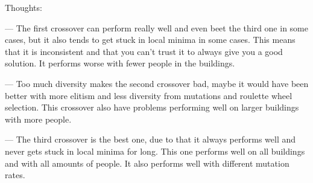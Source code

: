 Thoughts:

— The first crossover can perform really well and even beet the third one in some cases, but it also tends to get stuck in local minima in some cases. This means that it is inconsistent and that you can't trust it to always give you a good solution. It performs worse with fewer people in the buildings.

— Too much diversity makes the second crossover bad, maybe it would have been better with more elitism and less diversity from mutations and roulette wheel selection. This crossover also have problems performing well on larger buildings with more people.

— The third crossover is the best one, due to that it always performs well and never gets stuck in local minima for long. This one performs well on all buildings and with all amounts of people. It also performs well with different mutation rates.
